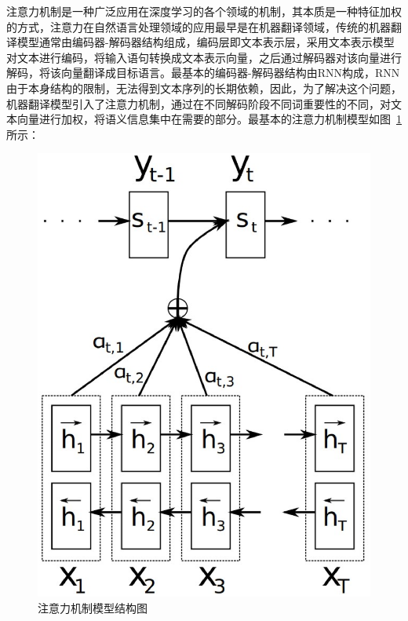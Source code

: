 注意力机制是一种广泛应用在深度学习的各个领域的机制，其本质是一种特征加权的方式，注意力在自然语言处理领域的应用最早是在机器翻译领域\cite{bahdanau2014neural}，传统的机器翻译模型通常由编码器-解码器结构组成，编码层即文本表示层，采用文本表示模型对文本进行编码，将输入语句转换成文本表示向量，之后通过解码器对该向量进行解码，将该向量翻译成目标语言。最基本的编码器-解码器结构由RNN构成，RNN由于本身结构的限制，无法得到文本序列的长期依赖，因此，为了解决这个问题，机器翻译模型引入了注意力机制，通过在不同解码阶段不同词重要性的不同，对文本向量进行加权，将语义信息集中在需要的部分。最基本的注意力机制模型如图~\ref{fig:attention}所示：
\begin{figure}[t!]
    \centering
    \includegraphics[scale=0.33, clip=true]{./sources/attention.eps}
    \vspace{-10pt}
    \caption{\label{fig:attention} 注意力机制模型结构图}
    \vspace{-5pt}
\end{figure}

